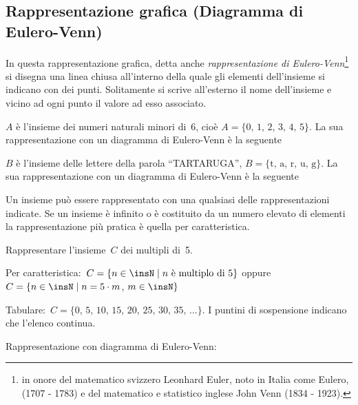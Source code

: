\vspazio\ovalbox{\ref{ese:5.32}}

\subsection{Rappresentazione grafica (Diagramma di Eulero-Venn)}

In questa rappresentazione grafica, detta anche \textit{rappresentazione
di Eulero-Venn}\footnote{in onore del matematico svizzero Leonhard Euler, noto in Italia come Eulero, (1707 - 1783) e del matematico e statistico inglese John Venn (1834 - 1923).} si disegna una linea chiusa all'interno della quale gli elementi
dell'insieme si indicano con dei punti. Solitamente si scrive all'esterno il nome dell'insieme
e vicino ad ogni punto il valore ad esso associato.

\begin{exrig}
 \begin{esempio}
 $A$ è l'insieme dei numeri naturali minori di~6, cioè $A=\{\text{0, 1, 2, 3, 4, 5}\}$.
 La sua rappresentazione con un diagramma di Eulero-Venn è la seguente
 \begin{center}
  
 \end{center}

 \end{esempio}

 \begin{esempio}
 $B$ è l'insieme delle lettere della parola ``TARTARUGA'', $B=\{\text{t, a, r, u, g}\}$.
 La sua rappresentazione con un diagramma di Eulero-Venn è la seguente
 \begin{center}
  
 \end{center}

 \end{esempio}

\end{exrig}

Un insieme può essere rappresentato con una qualsiasi delle
rappresentazioni indicate. Se un insieme è infinito o è costituito
da un numero elevato di elementi la rappresentazione più pratica è
quella per caratteristica.
\pagebreak
\begin{exrig}
 \begin{esempio}
 Rappresentare l'insieme~$C$ dei multipli di~5.

 Per caratteristica:~$C=\{n\in\insN\mid n\text{ è multiplo di }5\}$ oppure
$C=\{n\in\insN\mid n=5\cdot m$, $m\in\insN\}$

Tabulare:~$C=\{\text{0, 5, 10, 15, 20, 25, 30, 35, }\dots\}$. I puntini di sospensione indicano che l'elenco continua.

Rappresentazione con diagramma di Eulero-Venn:
\begin{center}
 
\end{center}
 \end{esempio}
\end{exrig}

